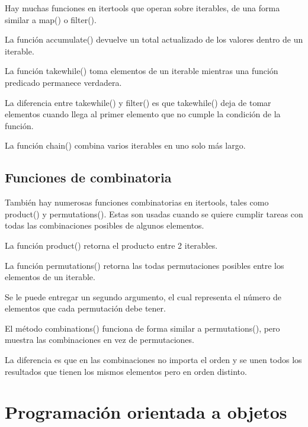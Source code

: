 \documentclass{report}
\begin{document}
Hay muchas funciones en itertools que operan sobre iterables, de una forma similar a map() o filter().

La función accumulate() devuelve un total actualizado de los valores dentro de un iterable.


La función takewhile() toma elementos de un iterable mientras una función predicado permanece verdadera.


La diferencia entre takewhile() y filter() es que takewhile() deja de tomar elementos cuando llega al primer elemento que no cumple la condición de la función.


La función chain() combina varios iterables en uno solo más largo.


\section{Funciones de combinatoria}

También hay numerosas funciones combinatorias en itertools, tales como product() y permutations(). Estas son usadas cuando se quiere cumplir tareas con todas las combinaciones posibles de algunos elementos.

La función product() retorna el producto entre 2 iterables.


La función permutations() retorna las todas permutaciones posibles entre los elementos de un iterable.



Se le puede entregar un segundo argumento, el cual representa el número de elementos que cada permutación debe tener.


El método combinations() funciona de forma similar a permutations(), pero muestra las combinaciones en vez de permutaciones.


La diferencia es que en las combinaciones no importa el orden y se unen todos los resultados que tienen los mismos elementos pero en orden distinto.

\clearpage\chapter{Programación orientada a objetos}
\end{document}
